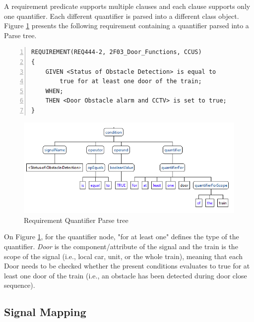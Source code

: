 A requirement predicate supports multiple clauses and each clause supports only one quantifier. Each different quantifier is parsed into a different class object. Figure \ref{fig:quantifier_parse_tree} presents the following requirement containing a quantifier parsed into a Parse tree.


\begin{Verbatim}[numbers=left]
REQUIREMENT(REQ444-2, 2F03_Door_Functions, CCUS) 
{
	GIVEN <Status of Obstacle Detection> is equal to
	    true for at least one door of the train;
	WHEN;
	THEN <Door Obstacle alarm and CCTV> is set to true;
}
\end{Verbatim}
\label{req:door_obstacle_pt}

\begin{figure}[H]
    \centering
    \includegraphics[scale=0.85]{images/quantifier_parse_tree.PNG}
    \caption{Requirement Quantifier Parse tree}
    \label{fig:quantifier_parse_tree}
\end{figure}


On Figure \ref{fig:quantifier_parse_tree}, for the quantifier node, "for at least one" defines the type of the quantifier. \textit{Door} is the component/attribute of the signal and the train is the scope of the signal (i.e., local car, unit, or the whole train), meaning that each Door needs to be checked whether the present conditions  evaluates to true for at least one door of the train (i.e., an obstacle has been detected during door close sequence).


\subsection{Signal Mapping}
\label{subsec:signal_mapping}

